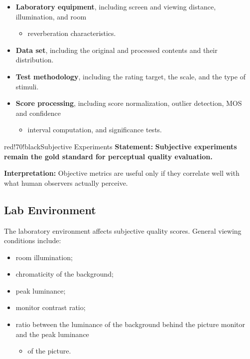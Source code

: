 \begin{itemize}
\item \textbf{Laboratory equipment}, including screen and viewing distance, illumination, and room
\begin{itemize}
\item reverberation characteristics.
\end{itemize}
\item \textbf{Data set}, including the original and processed contents and their distribution.
\item \textbf{Test methodology}, including the rating target, the scale, and the type of stimuli.
\item \textbf{Score processing}, including score normalization, outlier detection, MOS and confidence
\begin{itemize}
\item interval computation, and significance tests.
\end{itemize}
\end{itemize}

\begin{calloutbox}{red!70!black}{Subjective Experiments}
\textbf{Statement:} \textbf{Subjective experiments remain the gold standard for perceptual quality evaluation.}

\textbf{Interpretation:} Objective metrics are useful only if they correlate well with what human observers actually perceive.
\end{calloutbox}

\subsection{Lab Environment}

The laboratory environment affects subjective quality scores. General viewing conditions include:

\begin{itemize}
\item room illumination;
\item chromaticity of the background;
\item peak luminance;
\item monitor contrast ratio;
\item ratio between the luminance of the background behind the picture monitor and the peak luminance
\begin{itemize}
\item of the picture.
\end{itemize}
\end{itemize}

